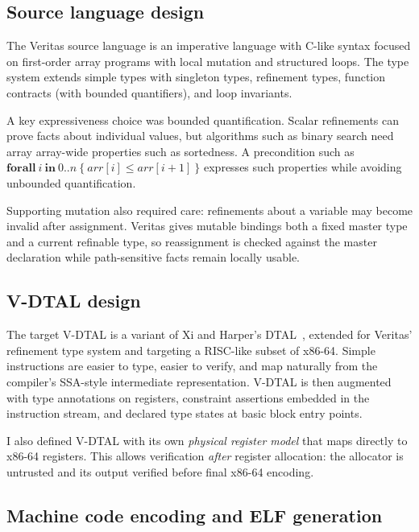 \subsection{Source language design}

The Veritas source language is an imperative language with C-like syntax focused on first-order array programs with local mutation and structured loops. The type system extends simple types with singleton types, refinement types, function contracts (with bounded quantifiers), and loop invariants.

A key expressiveness choice was bounded quantification. Scalar refinements can prove facts about individual values, but algorithms such as binary search need array array-wide properties such as sortedness. A precondition such as $\mathbf{forall}\ i\ \mathbf{in}\ 0..n\ \{\ \mathit{arr}[i] \le \mathit{arr}[i + 1]\ \}$ expresses such properties while avoiding unbounded quantification.

Supporting mutation also required care: refinements about a variable may become invalid after assignment. Veritas gives mutable bindings both a fixed master type and a current refinable type, so reassignment is checked against the master declaration while path-sensitive facts remain locally usable.

\subsection{V-DTAL design}
The target V-DTAL is a variant of Xi and Harper's DTAL~\cite{Xi2001DTAL}, extended for Veritas' refinement type system and targeting a RISC-like subset of x86-64. Simple instructions are easier to type, easier to verify, and map naturally from the compiler’s SSA-style intermediate representation. V-DTAL is then augmented with type annotations on registers, constraint assertions embedded in the instruction stream, and declared type states at basic block entry points.

I also defined V-DTAL with its own \textit{physical register model} that maps directly to x86-64 registers. This allows verification \textit{after} register allocation: the allocator is untrusted and its output verified before final x86-64 encoding.

\subsection{Machine code encoding and ELF generation}


